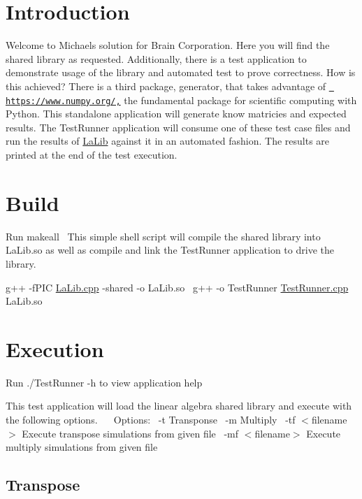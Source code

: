 \hypertarget{index_intro_sec}{}\section{Introduction}\label{index_intro_sec}
Welcome to Michael\textquotesingle{}s solution for Brain Corporation. Here you will find the shared library as requested. Additionally, there is a test application to demonstrate usage of the library and automated test to prove correctness. How is this achieved? There is a third package, generator, that takes advantage of \href{https://www.numpy.org/,}{\texttt{ https\+://www.\+numpy.\+org/,}} the fundamental package for scientific computing with Python. This standalone application will generate know matricies and expected results. The Test\+Runner application will consume one of these test case files and run the results of \mbox{\hyperlink{namespaceLaLib}{La\+Lib}} against it in an automated fashion. The results are printed at the end of the test execution.\hypertarget{index_install_sec}{}\section{Build}\label{index_install_sec}
Run makeall~\newline
 This simple shell script will compile the shared library into La\+Lib.\+so as well as compile and link the Test\+Runner application to drive the library.

g++ -\/f\+P\+IC \mbox{\hyperlink{LaLib_8cpp}{La\+Lib.\+cpp}} -\/shared -\/o La\+Lib.\+so~\newline
 g++ -\/o Test\+Runner \mbox{\hyperlink{TestRunner_8cpp}{Test\+Runner.\+cpp}} La\+Lib.\+so\hypertarget{index_exe_sec}{}\section{Execution}\label{index_exe_sec}
Run ./\+Test\+Runner -\/h to view application help

This test application will load the linear algebra shared library and execute with the following options.~\newline
~\newline
 Options\+:~\newline
 -\/t Transponse~\newline
 -\/m Multiply~\newline
 -\/tf $<$filename$>$ Execute transpose simulations from given file~\newline
 -\/mf $<$filename$>$ Execute multiply simulations from given file~\newline
~\newline
 \hypertarget{index_trans_subc}{}\subsection{Transpose}\label{index_trans_subc}

